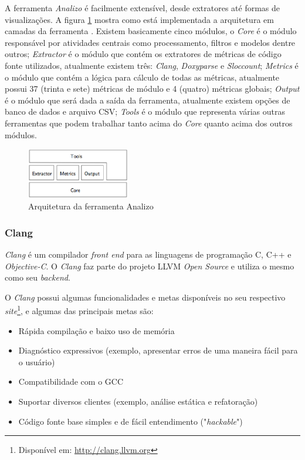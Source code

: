 A ferramenta \emph{Analizo} é facilmente extensível, desde extratores até formas
de visualizações. A figura \ref{archanalizo} mostra
como está implementada a arquitetura em camadas da ferramenta \cite{analizoartigo}. Existem basicamente cinco módulos, o 
\textit{Core} é o módulo responsável por atividades centrais como processamento,
filtros e modelos dentre outros; 
\textit{Extractor} é o módulo que contém os extratores de métricas de código
fonte utilizados, atualmente existem três: \textit{Clang}, \textit{Doxyparse}
e \textit{Sloccount}; \textit{Metrics} é o módulo que contém a lógica para
cálculo de todas as métricas, atualmente possui
37 (trinta e sete) métricas de módulo e 4 (quatro) métricas globais; \textit{Output} é o módulo que será dada a saída da 
ferramenta, atualmente existem opções de banco de dados e arquivo CSV; \textit{Tools} é o módulo que representa várias outras
ferramentas que podem trabalhar tanto acima do \textit{Core} quanto acima dos outros módulos.

\begin{figure}[h]
  \centering
  \includegraphics[width=0.4\textwidth]
      {figuras/analizo.eps}
      \caption{Arquitetura da ferramenta Analizo \cite{analizoartigo}}
  \label{archanalizo}
\end{figure}

\subsubsection{Clang} \label{clang}

\emph{Clang} é um compilador \textit{front end} para as linguagens de
programação C, C++ e \textit{Objective-C}. O \emph{Clang} faz parte
do projeto LLVM \textit{Open Source} e utiliza o mesmo como seu \textit{backend}. 

O \emph{Clang} possui algumas funcionalidades e metas disponíveis no seu respectivo
\textit{site}\footnote{Disponível em: \url{http://clang.llvm.org}}, e
algumas das principais metas são:

\begin{itemize}
  \item Rápida compilação e baixo uso de memória
  \item Diagnóstico expressivos (exemplo, apresentar erros de uma maneira fácil para o usuário)
  \item Compatibilidade com o GCC
  \item Suportar diversos clientes (exemplo, análise estática e refatoração)
  \item Código fonte base simples e de fácil entendimento ("\textit{hackable}")
\end{itemize}

